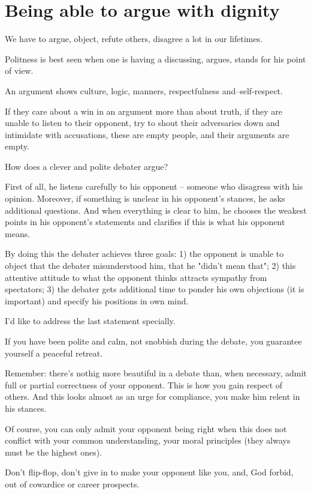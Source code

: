 \chapter{Being able to argue with dignity}

We have to argue, object, refute others, disagree a lot in our lifetimes.

Politness is best seen when one is having a discussing, argues, stands for his point of view.

An argument shows culture, logic, manners, respectfulness and--self-respect.

If they care about a win in an argument more than about truth, if they are unable to listen to their opponent, try to shout their adversaries down and intimidate with accusations, these are empty people, and their arguments are empty.

How does a clever and polite debater argue?

First of all, he listens carefully to his opponent -- someone who disagress with his opinion. Moreover, if something is unclear in his opponent's stances, he asks additional questions. And when everything is clear to him, he chooses the weakest points in his opponent's statements and clarifies if this is what his opponent means.

By doing this the debater achieves three goals: 1) the opponent is unable to object that the debater misunderstood him, that he "didn't mean that"; 2) this attentive attitude to what the opponent thinks attracts sympathy from spectators; 3) the debater gets additional time to ponder his own objections (it is important) and specify his positions in own mind.

I'd like to address the last statement specially.

If you have been polite and calm, not snobbish during the debate, you guarantee yourself a peaceful retreat.

Remember: there's nothig more beautiful in a debate than, when necessary, admit full or partial correctness of your opponent. This is how you gain respect of others. And this looks almost as an urge for compliance, you make him relent in his stances.

Of course, you can only admit your opponent being right when this does not conflict with your common understanding, your moral principles (they always must be the highest ones).

Don't flip-flop, don't give in to make your opponent like you, and, God forbid, out of cowardice or career prospects.

